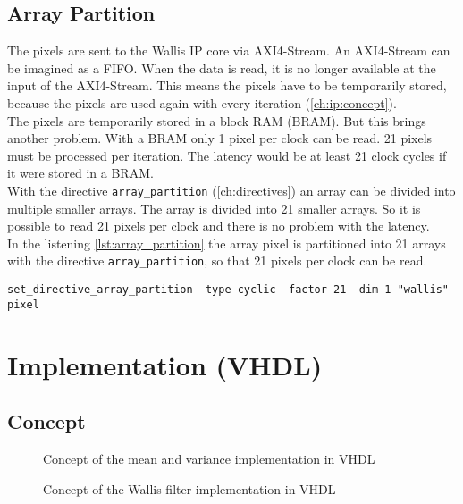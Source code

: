 \subsection{Array Partition}
The pixels are sent to the Wallis IP core via AXI4-Stream. An AXI4-Stream can be imagined as a FIFO. When the data is read, it is no longer available at the input of the AXI4-Stream. This means the pixels have to be temporarily stored, because the pixels are used again with every iteration (\ref{ch:ip:concept}). \\
The pixels are temporarily stored in a block RAM (BRAM). But this brings another problem. With a BRAM only 1 pixel per clock can be read. 21 pixels must be processed per iteration. The latency would be at least 21 clock cycles if it were stored in a BRAM. \\
With the directive \texttt{array\_partition} (\ref{ch:directives}) an array can be divided into multiple smaller arrays. The array is divided into 21 smaller arrays. So it is possible to read 21 pixels per clock and there is no problem with the latency. \\
In the listening \ref{lst:array_partition} the array pixel is partitioned into 21 arrays with the directive \texttt{array\_partition}, so that 21 pixels per clock can be read. 

\begin{minipage}{\textwidth}
\begin{lstlisting}[style=TextStyle, caption=Set directive array\_partition, label=lst:array_partition]
set_directive_array_partition -type cyclic -factor 21 -dim 1 "wallis" pixel
\end{lstlisting}
\end{minipage}



\section{Implementation (VHDL)} \label{ch:ip:imp_vhdl}

\subsection{Concept}

\begin{figure}[tb!]
    \centering
    \begin{adjustbox}{max width=\textwidth}
        
    \end{adjustbox}
    \caption{Concept of the mean and variance implementation in VHDL}
    \label{fig:mean_var_vhdl}
\end{figure}

\begin{figure}[tb!]
    \centering
    \begin{adjustbox}{max width=\textwidth}
        
    \end{adjustbox}
    \caption{Concept of the Wallis filter implementation in VHDL}
    \label{fig:wallis_vhdl}
\end{figure}